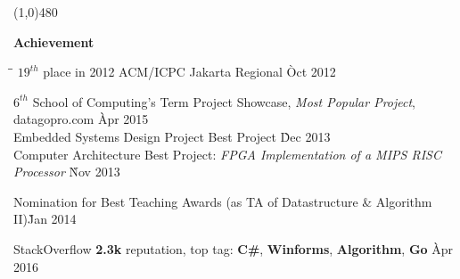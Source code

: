 \documentclass[9pt]{article}
\begin{document}
\centerline{\line(1,0){480}}

\medskip

\centerline {\Large \bf Achievement}

\medskip

\begin{tabbing}
\hspace{5.2in}\= \= \kill
\hspace{12pt} \textbullet \hspace{3pt} $19^{th}$ place in 2012 ACM/ICPC Jakarta Regional \` Oct 2012 \\
\end{tabbing}\vspace{-18pt}

\begin{tabbing}
\hspace{12pt} \textbullet \hspace{3pt} \textit{$6^{th}$} School of Computing's Term Project Showcase, \textit{Most Popular Project}, datagopro.com \` Apr 2015 \\
\hspace{12pt} \textbullet \hspace{3pt} Embedded Systems Design Project Best Project \` Dec 2013 \\
\hspace{12pt} \textbullet \hspace{3pt} Computer Architecture Best Project: \textit{FPGA Implementation of a MIPS RISC Processor} \` Nov 2013 \\
\end{tabbing}\vspace{-18pt}

\begin{tabbing}
\hspace{12pt} \textbullet \hspace{3pt} Nomination for Best Teaching Awards (as TA of Datastructure \& Algorithm II)\` Jan 2014 \\
\end{tabbing}\vspace{-18pt}

\begin{tabbing}
\hspace{12pt} \textbullet \hspace{3pt} StackOverflow {\bf 2.3k} reputation, top tag: {\bf C\#}, {\bf Winforms}, {\bf Algorithm}, {\bf Go} \` Apr 2016 \\
\end{tabbing}\vspace{-18pt}
\end{document}
